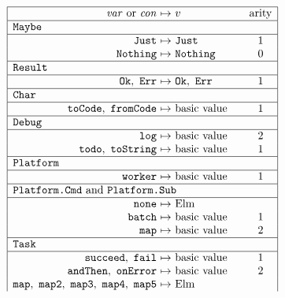 \begin{figure}[htbp]
\centering
\small
\[
\begin{array}{|r@{\ }c@{\ }l@{\qquad}c|}
\hline
\var\ \text{or}\ \con & \mapsto & v & \arity\\
\hline
\multicolumn{4}{|l|}{\kw{Maybe}}\\
\hline
\kw{Just}\citealso{b:Maybe.Maybe} & \mapsto & \kw{Just} & 1\\
\kw{Nothing}\citealso{b:Maybe.Maybe} & \mapsto & \kw{Nothing} & 0\\
\hline
\multicolumn{4}{|l|}{\kw{Result}}\\
\hline
\kw{Ok}\citealso{b:Result.Result},\ \kw{Err}\citealso{b:Result.Result} & \mapsto & \kw{Ok},\ \kw{Err} & 1\\
\hline
\multicolumn{4}{|l|}{\kw{Char}}\\
\hline
\kw{toCode}\citealso{b:Char.toCode},\ \kw{fromCode}\citealso{b:Char.fromCode} & \mapsto & \text{basic value} & 1\\
\hline
\multicolumn{4}{|l|}{\kw{Debug}}\\
\hline
\kw{log}\citealso{b:Debug.log} & \mapsto & \text{basic value} & 2\\
\kw{todo}\citealso{b:Debug.todo},\ \kw{toString}\citealso{b:Debug.toString} & \mapsto & \text{basic value} & 1\\
\hline
\multicolumn{4}{|l|}{\kw{Platform}}\\
\hline
\kw{worker}\citealso{b:Platform.worker} & \mapsto & \text{basic value} & 1\\
\hline
\multicolumn{4}{|l|}{\kw{Platform.Cmd}\ \text{and}\ \kw{Platform.Sub}}\\
\hline
\kw{none}\citealso{b:Platform.Cmd.none}\citealso{b:Platform.Sub.none} & \mapsto & \text{Elm} & \\
\kw{batch}\citealso{b:Platform.Cmd.batch}\citealso{b:Platform.Sub.batch} & \mapsto & \text{basic value} & 1\\
\kw{map}\citealso{b:Platform.Cmd.map}\citealso{b:Platform.Sub.map} & \mapsto & \text{basic value} & 2\\
\hline
\multicolumn{4}{|l|}{\kw{Task}}\\
\hline
\kw{succeed}\citealso{b:Task.succeed},\ \kw{fail}\citealso{b:Task.fail} & \mapsto & \text{basic value} & 1\\
\kw{andThen}\citealso{b:Task.andThen},\ \kw{onError}\citealso{b:Task.onError} & \mapsto & \text{basic value} & 2\\
\kw{map}\citealso{b:Task.map},\ \kw{map2}\citealso{b:Task.map2},\ \kw{map3}\citealso{b:Task.map3},\ \kw{map4}\citealso{b:Task.map4},\ \kw{map5}\citealso{b:Task.map5} & \mapsto & \text{Elm} & \\

\end{array}\]
\end{figure}
